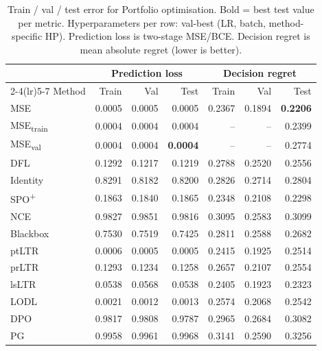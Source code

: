 \begin{table}[t]
\centering
\caption{Train / val / test error for Portfolio optimisation. Bold = best test value per metric. Hyperparameters per row: val-best (LR, batch, method-specific HP). Prediction loss is two-stage MSE/BCE. Decision regret is mean absolute regret (lower is better).}
\label{tab:err-portfolio}
\setlength{\tabcolsep}{4pt}
\renewcommand{\arraystretch}{1.05}
\begin{tabular}{@{}lrrrrrr@{}}
\toprule
& \multicolumn{3}{c}{Prediction loss} & \multicolumn{3}{c}{Decision regret} \\
\cmidrule(lr){2-4}\cmidrule(lr){5-7}
Method & Train & Val & Test & Train & Val & Test \\
\midrule
MSE & 0.0005 & 0.0005 & 0.0005 & 0.2367 & 0.1894 & \textbf{0.2206} \\
MSE\textsubscript{train} & 0.0004 & 0.0004 & 0.0004 & -- & -- & 0.2399 \\
MSE\textsubscript{val} & 0.0004 & 0.0004 & \textbf{0.0004} & -- & -- & 0.2774 \\
DFL & 0.1292 & 0.1217 & 0.1219 & 0.2788 & 0.2520 & 0.2556 \\
Identity & 0.8291 & 0.8182 & 0.8200 & 0.2826 & 0.2714 & 0.2804 \\
SPO\textsuperscript{+} & 0.1863 & 0.1840 & 0.1865 & 0.2348 & 0.2108 & 0.2298 \\
NCE & 0.9827 & 0.9851 & 0.9816 & 0.3095 & 0.2583 & 0.3099 \\
Blackbox & 0.7530 & 0.7519 & 0.7425 & 0.2811 & 0.2588 & 0.2682 \\
ptLTR & 0.0006 & 0.0005 & 0.0005 & 0.2415 & 0.1925 & 0.2514 \\
prLTR & 0.1293 & 0.1234 & 0.1258 & 0.2657 & 0.2107 & 0.2554 \\
lsLTR & 0.0538 & 0.0568 & 0.0538 & 0.2405 & 0.1923 & 0.2323 \\
LODL & 0.0021 & 0.0012 & 0.0013 & 0.2574 & 0.2068 & 0.2542 \\
DPO & 0.9817 & 0.9808 & 0.9787 & 0.2965 & 0.2684 & 0.3082 \\
PG & 0.9958 & 0.9961 & 0.9968 & 0.3141 & 0.2590 & 0.3256 \\
\bottomrule
\end{tabular}
\end{table}

